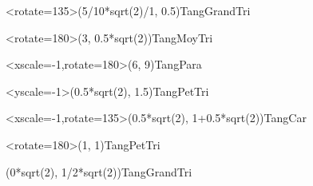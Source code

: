 \documentclass{standalone}
\begin{document}
\begin{EnvTangramTikz}

\PieceTangram[TangSol]<rotate=135>(5/10*sqrt(2)/1, 0.5){TangGrandTri}

\PieceTangram[TangSol]<rotate=180>(3, 0.5*sqrt(2)){TangMoyTri}

\PieceTangram[TangSol]<xscale=-1,rotate=180>(6, 9){TangPara}

\PieceTangram[TangSol]<yscale=-1>(0.5*sqrt(2), 1.5){TangPetTri}

\PieceTangram[TangSol]<xscale=-1,rotate=135>(0.5*sqrt(2), 1+0.5*sqrt(2)){TangCar}

\PieceTangram[TangSol]<rotate=180>(1, 1){TangPetTri}

\PieceTangram[TangSol](0*sqrt(2), 1/2*sqrt(2)){TangGrandTri}

\end{EnvTangramTikz}
\end{document}

